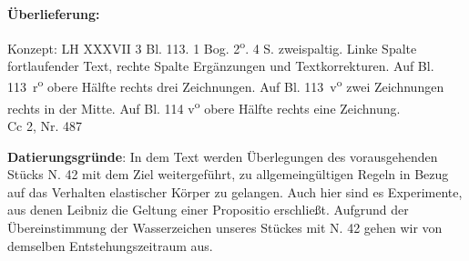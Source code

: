       
               
                \begin{ledgroupsized}[r]{120mm}
                \footnotesize 
                \pstart                
                \noindent\textbf{\"{U}berlieferung:}   
                \pend
                \end{ledgroupsized}
            
              
                            \begin{ledgroupsized}[r]{114mm}
                            \footnotesize 
                            \pstart \parindent -6mm
                            Konzept: LH XXXVII 3 Bl. 113. 1 Bog. 2\textsuperscript{o}. 4 S. zweispaltig. Linke Spalte fortlaufender Text, rechte Spalte Erg\"{a}nzungen und Textkorrekturen. Auf Bl. 113~r\textsuperscript{o} obere H\"{a}lfte rechts drei Zeichnungen. Auf Bl. 113~v\textsuperscript{o} zwei Zeichnungen rechts in der Mitte. Auf Bl. 114 v\textsuperscript{o} obere H\"{a}lfte rechts eine Zeichnung. \\Cc 2, Nr. 487 \pend
                            \end{ledgroupsized}
                \vspace*{5mm}
                \begin{ledgroup}
                \footnotesize 
                \pstart
            \noindent\footnotesize{\textbf{Datierungsgr\"{u}nde}: In dem Text werden \"{U}berlegungen des vorausgehenden St\"{u}cks N. 42 mit dem Ziel weitergef\"{u}hrt, zu allgemeing\"{u}ltigen Regeln in Bezug auf das Verhalten elastischer K\"{o}rper zu gelangen. Auch hier sind es Experimente, aus denen Leibniz die Geltung einer Propositio erschließt. Aufgrund der \"{U}bereinstimmung der Wasserzeichen unseres St\"{u}ckes mit N. 42 gehen wir von demselben Entstehungszeitraum aus.}
                \pend
                \end{ledgroup}
            
